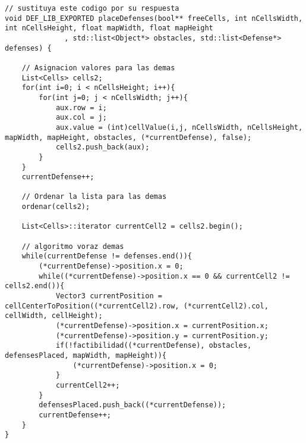 \begin{lstlisting}
// sustituya este codigo por su respuesta
void DEF_LIB_EXPORTED placeDefenses(bool** freeCells, int nCellsWidth, int nCellsHeight, float mapWidth, float mapHeight
              , std::list<Object*> obstacles, std::list<Defense*> defenses) {

    // Asignacion valores para las demas
    List<Cells> cells2;
    for(int i=0; i < nCellsHeight; i++){
        for(int j=0; j < nCellsWidth; j++){ 
            aux.row = i;
            aux.col = j;
            aux.value = (int)cellValue(i,j, nCellsWidth, nCellsHeight, mapWidth, mapHeight, obstacles, (*currentDefense), false); 
            cells2.push_back(aux);
        }
    }
    currentDefense++;
        
    // Ordenar la lista para las demas
    ordenar(cells2);

    List<Cells>::iterator currentCell2 = cells2.begin();

    // algoritmo voraz demas
    while(currentDefense != defenses.end()){
        (*currentDefense)->position.x = 0;
        while((*currentDefense)->position.x == 0 && currentCell2 != cells2.end()){
            Vector3 currentPosition = cellCenterToPosition((*currentCell2).row, (*currentCell2).col, cellWidth, cellHeight);
            (*currentDefense)->position.x = currentPosition.x;
            (*currentDefense)->position.y = currentPosition.y;
            if(!factibilidad((*currentDefense), obstacles, defensesPlaced, mapWidth, mapHeight)){
                (*currentDefense)->position.x = 0;
            }
            currentCell2++;
        }
        defensesPlaced.push_back((*currentDefense));
        currentDefense++;
    }
}
\end{lstlisting}

